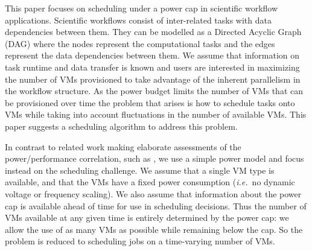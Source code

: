 \documentclass[10pt, conference, compsocconf]{IEEEtran} %
\newcommand{\ie}{\textit{i.e.}\ }
\begin{document}

This paper focuses on scheduling under a power cap in scientific workflow applications.
Scientific workflows \cite{deelmanbook} consist of inter-related tasks with data dependencies between them.
They can be modelled as a Directed Acyclic Graph (DAG) where the nodes represent the computational tasks and the edges represent the data dependencies between them.
We assume that information on task runtime and data transfer is known and users are interested in maximizing the number of VMs provisioned to take advantage of the inherent parallelism in the workflow structure.
As the power budget limits the number of VMs that can be provisioned over time the problem that arises is how to schedule tasks onto VMs while taking into account fluctuations in the number of available VMs.
This paper suggests a scheduling algorithm to address this problem.

In contrast to related work making elaborate assessments of the power/performance correlation, such as \cite{bailey2014adaptive}, we use a simple power model and focus instead on the scheduling challenge.
We assume that a single VM type is available, and that the VMs have a fixed power consumption (\ie no dynamic voltage or frequency scaling).
We also assume that information about the power cap is available ahead of time for use in scheduling decisions.
Thus the number of VMs available at any given time is entirely determined by the power cap: we allow the use of as many VMs as possible while remaining below the cap.
So the problem is reduced to scheduling jobs on a time-varying number of VMs.
\end{document}
